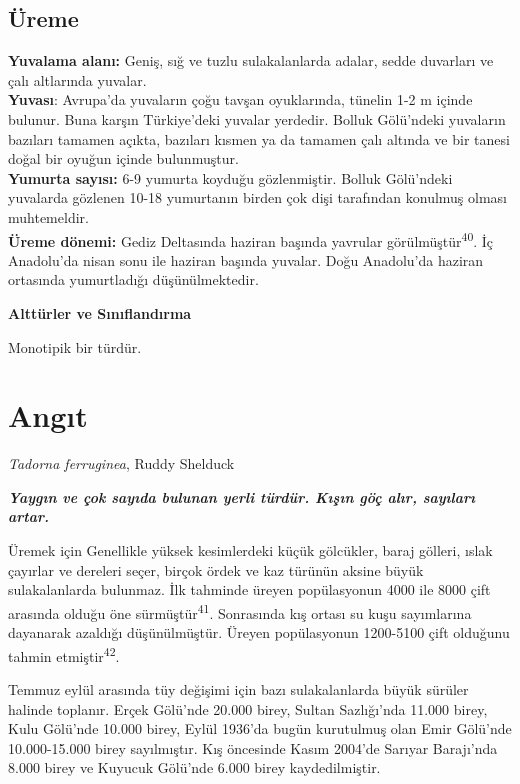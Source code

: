 \documentclass[
  letterpaper,
  DIV=11,
  numbers=noendperiod]{scrreprt}
\begin{document}
\hypertarget{uxfcreme-11}{%
\subsection{\texorpdfstring{\textbf{Üreme}}{Üreme}}\label{uxfcreme-11}}

\textbf{Yuvalama alanı:} Geniş, sığ ve tuzlu sulakalanlarda adalar,
sedde duvarları ve çalı altlarında yuvalar.\\
\textbf{Yuvası}: Avrupa'da yuvaların çoğu tavşan oyuklarında, tünelin
1-2 m içinde bulunur. Buna karşın Türkiye'deki yuvalar yerdedir. Bolluk
Gölü'ndeki yuvaların bazıları tamamen açıkta, bazıları kısmen ya da
tamamen çalı altında ve bir tanesi doğal bir oyuğun içinde
bulunmuştur.\\
\textbf{Yumurta sayısı:} 6-9 yumurta koyduğu gözlenmiştir. Bolluk
Gölü'ndeki yuvalarda gözlenen 10-18 yumurtanın birden çok dişi
tarafından konulmuş olması muhtemeldir.\\
\textbf{Üreme dönemi:} Gediz Deltasında haziran başında yavrular
görülmüştür\textsuperscript{40}. İç Anadolu'da nisan sonu ile haziran
başında yuvalar. Doğu Anadolu'da haziran ortasında yumurtladığı
düşünülmektedir.

\textbf{Alttürler ve Sınıflandırma}

Monotipik bir türdür.

\hypertarget{angux131t}{%
\section{Angıt}\label{angux131t}}

\emph{Tadorna ferruginea}, Ruddy Shelduck

\textbf{\emph{Yaygın ve çok sayıda bulunan yerli türdür. Kışın göç alır,
sayıları artar.}}

Üremek için Genellikle yüksek kesimlerdeki küçük gölcükler, baraj
gölleri, ıslak çayırlar ve dereleri seçer, birçok ördek ve kaz türünün
aksine büyük sulakalanlarda bulunmaz. İlk tahminde üreyen popülasyonun
4000 ile 8000 çift arasında olduğu öne sürmüştür\textsuperscript{41}.
Sonrasında kış ortası su kuşu sayımlarına dayanarak azaldığı
düşünülmüştür. Üreyen popülasyonun 1200-5100 çift olduğunu tahmin
etmiştir\textsuperscript{42}.

Temmuz eylül arasında tüy değişimi için bazı sulakalanlarda büyük
sürüler halinde toplanır. Erçek Gölü'nde 20.000 birey, Sultan
Sazlığı'nda 11.000 birey, Kulu Gölü'nde 10.000 birey, Eylül 1936'da
bugün kurutulmuş olan Emir Gölü'nde 10.000-15.000 birey sayılmıştır. Kış
öncesinde Kasım 2004'de Sarıyar Barajı'nda 8.000 birey ve Kuyucuk
Gölü'nde 6.000 birey kaydedilmiştir.
\end{document}
